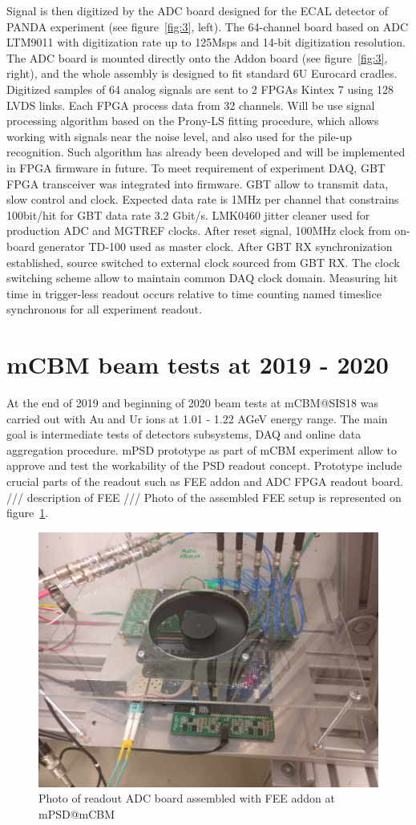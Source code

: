 \documentclass[a4paper,11pt]{article}
\begin{document}
Signal is then digitized by the ADC board designed for the ECAL detector of PANDA experiment \cite{4} (see figure~\ref{fig:3}, left). The 64-channel board based on ADC LTM9011 with digitization rate up to 125Msps and 14-bit digitization resolution. The ADC board is mounted directly onto the Addon board (see figure~\ref{fig:3}, right), and the whole assembly is designed to fit standard 6U Eurocard cradles.
Digitized samples of 64 analog signals are sent to 2 FPGAs Kintex 7 using 128 LVDS links. Each FPGA process data from 32 channels. Will be use signal processing algorithm based on the Prony-LS fitting procedure, which allows working with signals near the noise level, and also used for the pile-up recognition. Such algorithm has already been developed and will be implemented in FPGA firmware in future.
To meet requirement of experiment DAQ, GBT FPGA transceiver was integrated into firmware. GBT allow to transmit data, slow control and clock. Expected data rate is 1MHz per channel that constrains 100bit/hit for GBT data rate 3.2 Gbit/s. 
LMK0460 jitter cleaner used for production ADC and MGTREF clocks. After reset signal, 100MHz clock from on-board generator TD-100 used as master clock. After GBT RX synchronization established, source switched to external clock sourced from GBT RX. The clock switching scheme allow to maintain common DAQ clock domain. Measuring hit time in trigger-less readout occurs relative to time counting named timeslice synchronous for all experiment readout.

\section{mCBM beam tests at 2019 - 2020}
At the end of 2019 and beginning of 2020 beam tests at mCBM@SIS18 was carried out with Au and Ur ions at 1.01 - 1.22 AGeV energy range. The main goal is intermediate tests of detectors subsystems, DAQ and online data aggregation procedure. mPSD prototype as part of mCBM experiment allow to approve and test the workability of the PSD readout concept. Prototype include crucial parts of the readout such as FEE addon and ADC FPGA readout board.
/// description of FEE ///
Photo of the assembled FEE setup is represented on figure~\ref{fig:4}.

\begin{figure}[htbp]
\centering %
\includegraphics[width=.5\textwidth]{mPSD_FEE_photo.jpg}
\caption{\label{fig:4} Photo of readout ADC board assembled with FEE addon at mPSD@mCBM}
\end{figure}
\end{document}
